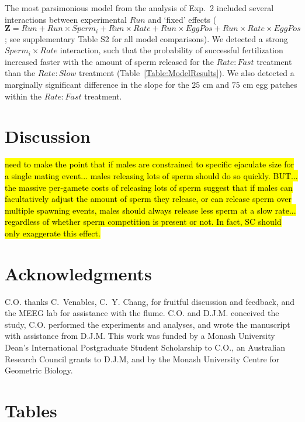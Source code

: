 \documentclass{article}
\begin{document}
	The most parsimonious model from the analysis of Exp.~2 included several interactions between experimental $Run$ and `fixed' effects ($\mathbf{Z} = Run + Run \times Sperm_i + Run \times Rate + Run \times EggPos + Run \times Rate \times EggPos$; see supplementary Table S2 for all model comparisons). We detected a strong $Sperm_i \times Rate$ interaction, such that the probability of successful fertilization increased faster with the amount of sperm released for the $Rate:Fast$ treatment than the $Rate:Slow$ treatment (Table~\ref{Table:ModelResults}). We also detected a marginally significant difference in the slope for the $25$ cm and $75$ cm egg patches within the $Rate:Fast$ treatment.


\section*{Discussion}

\hl{need to make the point that if males are constrained to specific ejaculate size for a single mating event... males releasing lots of sperm should do so quickly.  BUT... the massive per-gamete costs of releasing lots of sperm suggest that if males can facultatively adjust the amount of sperm they release, or can release sperm over multiple spawning events, males should always release less sperm at a slow rate... regardless of whether sperm competition is present or not. In fact, SC should only exaggerate this effect.}



\section*{Acknowledgments}
C.O. thanks C.~Venables, C.~Y. Chang, for fruitful discussion and feedback, and the MEEG lab for assistance with the flume. C.O. and D.J.M. conceived the study, C.O. performed the experiments and analyses, and wrote the manuscript with assistance from D.J.M. This work was funded by a Monash University Dean's International Postgraduate Student Scholarship to C.O., an Australian Research Council grants to D.J.M, and by the Monash University Centre for Geometric Biology.

\newpage{}




	 \section*{Tables}
	 \renewcommand{\thetable}{\arabic{table}}
	 \setcounter{table}{0}
\end{document}
